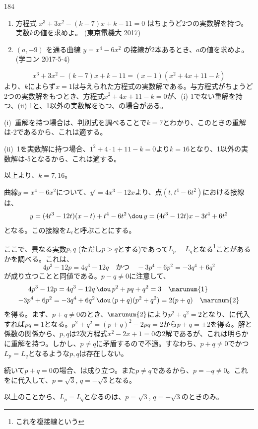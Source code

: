 \begin{prob}{184}{}{}
 \begin{enumerate}
  \item 方程式 $x^3+3x^2-(k-7)x+k-11=0$ はちょうど2つの実数解を持つ。実数$k$の値を求めよ。  (東京電機大 2017)
  \item $(a,-9)$ を通る曲線 $y=x^4-6x^2$ の接線が2本あるとき、$a$の値を求めよ。  (学コン 2017-5-4)
 \end{enumerate}
\end{prob}
\[ x^3+3x^2-(k-7)x+k-11=(x-1)(x^2+4x+11-k) \]
より、$k$によらず$x=1$は与えられた方程式の実数解である。与方程式がちょうど2つの実数解をもつとき、方程式$x^2+4x+11-k=0$が、(i) 1でない重解を持つ、(ii) 1と、1以外の実数解をもつ、の場合がある。

(i)~重解を持つ場合は、判別式を調べることで$k=7$とわかり、このときの重解は-2であるから、これは適する。

(ii)~1を実数解に持つ場合、$1^2+4\cdot 1+11-k=0$より$k=16$となり、1以外の実数解は-5となるから、これは適する。

以上より、$k=7, 16$。

曲線$y=x^4-6x^2$について、$y'=4x^3-12x$より、点$(t, t^4-6t^2)$における接線は、
\[ y=(4t^3-12t)(x-t)+t^4-6t^2 \,\dou\, y=(4t^3-12t)x-3t^4+6t^2 \]
となる。この接線を$L_t$と呼ぶことにする。

ここで、異なる実数$p, q$ (ただし$p>q$とする)であって$L_p=L_q$となる\footnote{これを複接線という}ことがあるかを調べる。これは、
\[ 4p^3-12p=4q^3-12q \quad\text{かつ}\quad -3p^4+6p^2=-3q^4+6q^2 \]
が成り立つことと同値である。$p-q\neq 0$に注意して、
\begin{align*}
 4p^3-12p=4q^3-12q \,&\dou\, p^2+pq+q^2=3 \quad \marunum{1} \\
 -3p^4+6p^2=-3q^4+6q^2 \,&\dou\, (p+q)(p^2+q^2)=2(p+q) \quad \marunum{2}
\end{align*}
を得る。まず、$p+q\neq 0$のとき、$\marunum{2}$により$p^2+q^2=2$となり、に代入すれば$pq=1$となる。$p^2+q^2=(p+q)^2-2pq=2$から$p+q=\pm 2$を得る。解と係数の関係から、$p, q$は2次方程式$x^2-2x+1=0$の2解であるが、これは明らかに重解を持つ。しかし、$p\neq q$に矛盾するので不適。すなわち、$p+q\neq 0$でかつ$L_p=L_q$となるような$p, q$は存在しない。

続いて$p+q=0$の場合、は成り立つ。また$p\neq q$であるから、$p=-q\neq 0$。これをに代入して、$p=\sqrt{3}$, $q=-\sqrt{3}$となる。

以上のことから、$L_p=L_q$となるのは、$p=\sqrt{3}$, $q=-\sqrt{3}$のときのみ。

